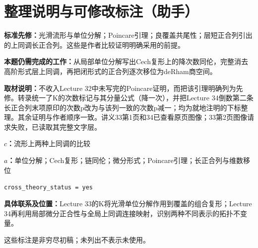 \documentclass[UTF8,11pt,a4paper]{ctexart}
\theoremstyle{definition}\newtheorem*{definition}{Definition}
\theoremstyle{remark}\newtheorem*{remark}{Remark}
\begin{document}
\section*{整理说明与可修改标注（助手）}
\textbf{标准先修：}光滑流形与单位分解；Poincare引理；良覆盖共尾性；层短正合列引出的上同调长正合列。这些是作者比较证明明确采用的前提。

\textbf{本题仍需完成的工作：}从局部单位分解写出Cech复形上的降次数同伦，完整消去高阶形式层上同调，再把闭形式的正合列逐次移位为deRham商空间。

\textbf{取材说明：}不收入Lecture 32中未写完的Poincare证明，而把该引理明确列为先修。转录统一了K的次数标记与其分量公式（降一次），并把Lecture 34倒数第二条长正合列末项原印的次数p改为与该列一致的次数p减一；均为就地注明的下标整理。其余证明与作者顺序一致。讲义33第1页和34已查看原页图像；33第2页图像请求失败，已读取其完整文字层。

\textbf{$c$：}流形上两种上同调的比较

\textbf{$a$：}单位分解；Cech复形；链同伦；微分形式；Poincare引理；长正合列与维数移位

\texttt{cross\_theory\_status = yes}

\textbf{具体联系及位置：}Lecture 33的K将光滑单位分解作用到覆盖的组合复形；Lecture 34再利用局部微分正合性与全局上同调连接映射，识别两种不同表示的拓扑不变量。

这些标注是非穷尽初稿；未列出不表示未使用。
\end{document}
